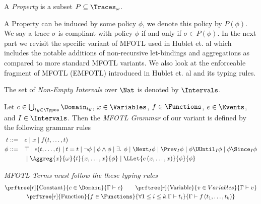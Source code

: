 \begin{definition}
    \label{def:property}
    A \emph{Property} is a subset $P\subseteq \Traces_\omega$.
\end{definition}

A Property can be induced by some policy $\phi$, we denote this policy by $P(\phi)$.
We say a trace $\sigma$ is compliant with policy $\phi$ if and only if $\sigma \in P(\phi)$.
In the next part we revisit the specific variant of MFOTL used in Hublet et. al \cite{lex}
which includes the notable additions of non-recursive let-bindings \cite{zingg2022verified}
and aggregations \cite{basin2015monitoring} as compared to more standard MFOTL variants.
We also look at the enforceable fragment of MFOTL (EMFOTL) introduced in Hublet et. al
\cite{whyenf} and its typing rules.

\begin{definition}
    \label{def:non-empty-intervals}
    The set of \emph{Non-Empty Intervals} over $\Nat$ is denoted by $\Intervals$.
\end{definition}

\begin{definition}
    \label{def:mfotl-grammar}
    Let $c \in \bigcup_{ty \in \Types} \Domain_{ty}$,
    $x \in \Variables$,
    $f \in \Functions$,
    $e \in \Events$,
    and $I \in \Intervals$.
    Then the \emph{MFOTL Grammar} of our variant is defined by the following grammar rules
    \begin{align*}
        t &::= &&c \mid x \mid f(t,\dots,t) \\
        \phi &::= &&\top \mid e(t,\dots,t) \mid t=t \mid \neg \phi \mid
            \phi \wedge \phi \mid  \exists.\ \phi \mid \Next_I \phi \mid
            \Prev_I \phi \mid \phi \UUntil_I \phi \mid \phi \Since_I \phi \\
            &&& \mid \Aggreg{x}{\omega}{t}{x,\dots,x}{\phi} \mid
            \LLet{e \left(x,\dots,x \right)}{\phi}{\phi}
    \end{align*}
\end{definition}

\begin{definition}
    \label{def:mfotl-term-typing-rules}
    \emph{MFOTL Terms must follow the these typing rules}
    \begin{gather*}
        \prftree[r]{\text{Constant}}
            {c \in \Domain}
            {\Gamma \vdash c} \qquad
        \prftree[r]{\text{Variable}}
            {v \in Variables}
            {\Gamma \vdash v} \\
        \prftree[r]{\text{Function}}
            {f \in \Functions}
            {\forall 1 \leq i \leq k. \Gamma \vdash t_i}
            {\Gamma \vdash f\left(t_1,\dots,t_k\right)}            
    \end{gather*}
\end{definition}

